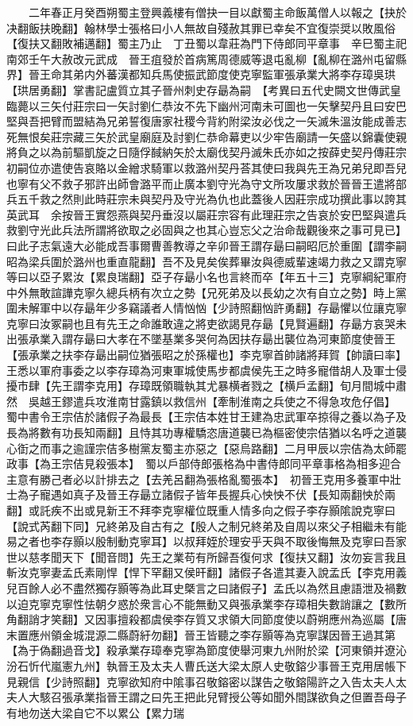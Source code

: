 　　二年春正月癸酉朔蜀主登興義樓有僧抉一目以獻蜀主命飯萬僧人以報之【抉於决翻飯扶晚翻】翰林學士張格曰小人無故自殘赦其罪已幸矣不宜復崇奨以敗風俗【復扶又翻敗補邁翻】蜀主乃止　丁丑蜀以韋莊為門下侍郎同平章事　辛巳蜀主祀南郊壬午大赦改元武成　晉王疽發於首病篤周德威等退屯亂柳【亂柳在潞州屯留縣界】晉王命其弟内外蕃漢都知兵馬使振武節度使克寧監軍張承業大將李存璋吳珙【珙居勇翻】掌書記盧質立其子晉州刺史存朂為嗣　【考異曰五代史闕文世傳武皇臨薨以三矢付莊宗曰一矢討劉仁恭汝不先下幽州河南未可圖也一矢擊契丹且曰安巴堅與吾把臂而盟結為兄弟誓復唐家社稷今背約附梁汝必伐之一矢滅朱溫汝能成善志死無恨矣莊宗藏三矢於武皇廟庭及討劉仁恭命幕吏以少牢告廟請一矢盛以錦囊使親將負之以為前驅凱旋之日隨俘馘納矢於太廟伐契丹滅朱氏亦如之按薛史契丹傳莊宗初嗣位亦遣使告哀賂以金繒求騎軍以救潞州契丹荅其使曰我與先王為兄弟兒即吾兒也寧有父不救子邪許出師會潞平而止廣本劉守光為守文所攻屢求救於晉晉王遣將部兵五千救之然則此時莊宗未與契丹及守光為仇也此蓋後人因莊宗成功撰此事以誇其英武耳　余按晉王實怨燕與契丹垂沒以屬莊宗容有此理莊宗之告哀於安巴堅與遣兵救劉守光此兵法所謂將欲取之必固與之也其心豈忘父之治命哉觀後來之事可見已】曰此子志氣遠大必能成吾事爾曹善教導之辛卯晉王謂存朂曰嗣昭厄於重圍【謂李嗣昭為梁兵圍於潞州也重直龍翻】吾不及見矣俟葬畢汝與德威輩速竭力救之又謂克寧等曰以亞子累汝【累良瑞翻】亞子存朂小名也言終而卒【年五十三】克寧綱紀軍府中外無敢諠譁克寧久總兵柄有次立之勢【兄死弟及以長幼之次有自立之勢】時上黨圍未解軍中以存朂年少多竊議者人情忷忷【少詩照翻忷許勇翻】存朂懼以位讓克寧克寧曰汝冢嗣也且有先王之命誰敢違之將吏欲謁見存朂【見賢遍翻】存朂方哀哭未出張承業入謂存朂曰大孝在不墜基業多哭何為因扶存朂出襲位為河東節度使晉王【張承業之扶李存朂出嗣位猶張昭之於孫權也】李克寧首帥諸將拜賀【帥讀曰率】王悉以軍府事委之以李存璋為河東軍城使馬步都虞侯先王之時多寵借胡人及軍士侵擾市肆【先王謂李克用】存璋既領職執其尤暴横者戮之【横戶孟翻】旬月間城中肅然　吳越王鏐遣兵攻淮南甘露鎮以救信州【牽制淮南之兵使之不得急攻危仔倡】　蜀中書令王宗佶於諸假子為最長【王宗佶本姓甘王建為忠武軍卒掠得之養以為子及長為將數有功長知兩翻】且恃其功專權驕恣唐道襲已為樞密使宗佶猶以名呼之道襲心衘之而事之逾謹宗佶多樹黨友蜀主亦惡之【惡烏路翻】二月甲辰以宗佶為太師罷政事【為王宗佶見殺張本】　蜀以戶部侍郎張格為中書侍郎同平章事格為相多迎合主意有勝己者必以計排去之【去羌呂翻為張格亂蜀張本】　初晉王克用多養軍中壯士為子寵遇如真子及晉王存朂立諸假子皆年長握兵心怏怏不伏【長知兩翻怏於兩翻】或託疾不出或見新王不拜李克寧權位既重人情多向之假子李存顥隂說克寧曰【說式芮翻下同】兄終弟及自古有之【殷人之制兄終弟及自周以來父子相繼未有能易之者也李存顥以殷制動克寧耳】以叔拜姪於理安乎天與不取後悔無及克寧曰吾家世以慈孝聞天下【聞音問】先王之業苟有所歸吾復何求【復扶又翻】汝勿妄言我且斬汝克寧妻孟氏素剛悍【悍下罕翻又侯旰翻】諸假子各遣其妻入說孟氏【李克用義兒百餘人必不盡然獨存顥等為此耳史槩言之曰諸假子】孟氏以為然且慮語泄及禍數以迫克寧克寧性怯朝夕惑於衆言心不能無動又與張承業李存璋相失數誚讓之【數所角翻誚才笑翻】又因事擅殺都虞侯李存質又求領大同節度使以蔚朔應州為巡屬【唐末置應州領金城混源二縣蔚紆勿翻】晉王皆聽之李存顥等為克寧謀因晉王過其第【為于偽翻過音戈】殺承業存璋奉克寧為節度使舉河東九州附於梁【河東領并遼沁汾石忻代嵐憲九州】執晉王及太夫人曹氏送大梁太原人史敬鎔少事晉王克用居帳下見親信【少詩照翻】克寧欲知府中隂事召敬鎔密以謀告之敬鎔陽許之入告太夫人太夫人大駭召張承業指晉王謂之曰先王把此兒臂授公等如聞外間謀欲負之但置吾母子有地勿送大梁自它不以累公【累力瑞